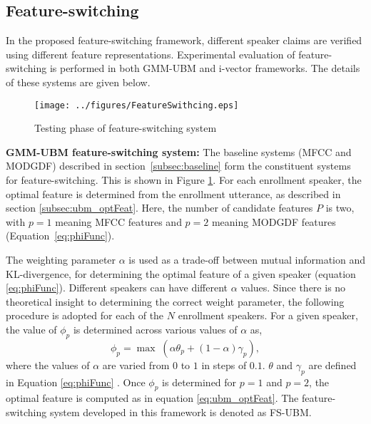 \documentclass[preprint,12pt,5p]{elsarticle}
\begin{document}
\subsection{Feature-switching}
\label{subsec:featSwitch}
In the proposed feature-switching framework, different speaker
claims are verified using different feature representations. 
Experimental evaluation of feature-switching is performed in both
GMM-UBM and i-vector frameworks. The details of these systems
are given below.
\begin{figure}[h]
\centering
\texttt{[image: ../figures/FeatureSwithcing.eps]}
\caption{Testing phase of feature-switching system}
\vspace{3mm}
\label{fig:systemArch2}
\end{figure}

\textbf{GMM-UBM feature-switching system:} 
\hspace{-6	mm}The baseline systems (MFCC and MODGDF) 
described in section~\ref{subsec:baseline} form the constituent systems for 
feature-switching. This is shown in Figure \ref{fig:systemArch2}. For each enrollment 
speaker, the optimal feature is determined from the enrollment utterance, as described in
section \ref{subsec:ubm_optFeat}. Here, the number of candidate features $P$
is two, with $p=1$ meaning MFCC features and $p=2$ meaning MODGDF features
(Equation~\ref{eq:phiFunc}).

The weighting parameter $\alpha$ is used as a trade-off between mutual information and
KL-divergence, for determining the optimal feature of a given speaker (equation
\ref{eq:phiFunc}). Different speakers can have different $\alpha$ values. Since
there is no theoretical insight to determining the correct weight parameter,
the following procedure is adopted for each of the $N$ enrollment speakers.
For a given speaker, the value of $\phi_p$ is determined across various values
of $\alpha$ as, 
\begin{equation}
\phi_p = \max \; (\alpha \theta_p + (1-\alpha) \gamma_p),
\end{equation}
where the values of $\alpha$ are varied from $0$ to $1$ in steps of $0.1$. $\theta$ and 
$\gamma_p$ are defined in Equation \ref{eq:phiFunc} . Once
$\phi_p$ is determined for $p=1$ and $p=2$, the optimal feature is computed as in equation
\ref{eq:ubm_optFeat}.
The feature-switching system developed in this framework is denoted as
FS-UBM. 
\end{document}
